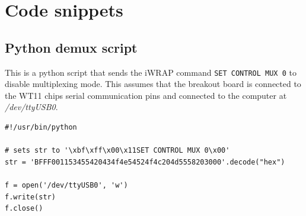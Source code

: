 \documentclass[a4paper, oneside, final]{memoir}
\begin{document}
\chapter{Code snippets}

\section{Python demux script}
\label{sec:python-demux-script}

This is a python script that sends the iWRAP command \texttt{SET CONTROL MUX 0}
to disable multiplexing mode. This assumes that the breakout board is connected
to the WT11 chips serial communication pins and connected to the computer at
\textit{/dev/ttyUSB0}.

\begin{verbatim}
#!/usr/bin/python

# sets str to '\xbf\xff\x00\x11SET CONTROL MUX 0\x00'
str = 'BFFF001153455420434f4e54524f4c204d5558203000'.decode("hex")

f = open('/dev/ttyUSB0', 'w')
f.write(str)
f.close()
\end{verbatim}
\end{document}
